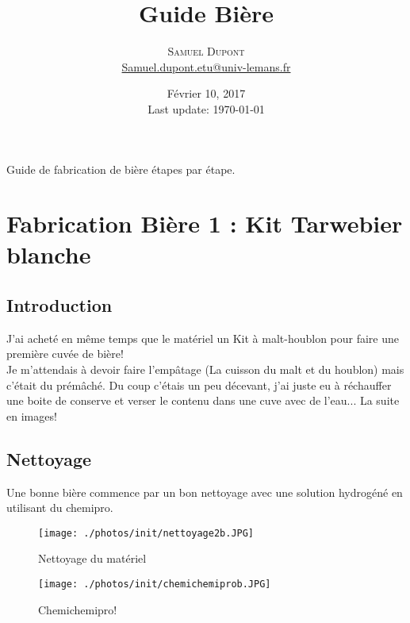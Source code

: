 \documentclass[twoside,twocolumn]{report}
\title{Guide Bière } %
\author{%
\textsc{Samuel Dupont}\\ %
\normalsize \href{mailto:Samuel.dupont.etu@univ-lemans.fr}{Samuel.dupont.etu@univ-lemans.fr } 
}
\date{Février 10, 2017 \\ Last update: \today}
\begin{document}
\maketitle

	Guide de fabrication de bière étapes par étape.
	\chapter*{Fabrication Bière 1 : Kit Tarwebier blanche}
		\section{Introduction}
			J'ai acheté en même temps que le matériel un Kit à malt-houblon pour faire une première cuvée de bière!\\
			Je m'attendais à devoir faire l'empâtage (La cuisson du malt et du houblon) mais c'était du prémâché. Du coup c'étais un peu décevant, j'ai juste eu à réchauffer une boite de conserve et verser le contenu dans une cuve avec de l'eau... La suite en images!
		\section{Nettoyage}
			Une bonne bière commence par un bon nettoyage avec une solution hydrogéné en utilisant du chemipro.
			\begin{figure}[h!]
				\centering
				\texttt{[image: ./photos/init/nettoyage2b.JPG]}
				\caption{Nettoyage du matériel}
				\label{netoyage}
			\end{figure}
			\begin{figure}[h!]
				\centering
				\texttt{[image: ./photos/init/chemichemiprob.JPG]}
				\caption{Chemichemipro!}
				\label{chemi}
			\end{figure}
\end{document}
